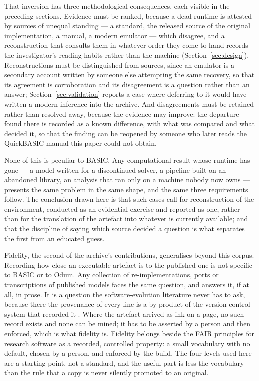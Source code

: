 That inversion has three methodological consequences, each visible in the preceding sections. Evidence must be ranked, because a dead runtime is attested by sources of unequal standing --- a standard, the released source of the original implementation, a manual, a modern emulator --- which disagree, and a reconstruction that consults them in whatever order they come to hand records the investigator's reading habits rather than the machine (Section~\ref{sec:design}). Reconstructions must be distinguished from sources, since an emulator is a secondary account written by someone else attempting the same recovery, so that its agreement is corroboration and its disagreement is a question rather than an answer; Section~\ref{sec:validation} reports a case where deferring to it would have written a modern inference into the archive. And disagreements must be retained rather than resolved away, because the evidence may improve: the departure found there is recorded as a known difference, with what was compared and what decided it, so that the finding can be reopened by someone who later reads the QuickBASIC manual this paper could not obtain.

None of this is peculiar to BASIC. Any computational result whose runtime has gone --- a model written for a discontinued solver, a pipeline built on an abandoned library, an analysis that ran only on a machine nobody now owns --- presents the same problem in the same shape, and the same three requirements follow. The conclusion drawn here is that such cases call for reconstruction of the environment, conducted as an evidential exercise and reported as one, rather than for the translation of the artefact into whatever is currently available; and that the discipline of saying which source decided a question is what separates the first from an educated guess.

Fidelity, the second of the archive's contributions, generalises beyond this corpus. Recording how close an executable artefact is to the published one is not specific to BASIC or to Odum. Any collection of re-implementations, ports or transcriptions of published models faces the same question, and answers it, if at all, in prose. It is a question the software-evolution literature never has to ask, because there the provenance of every line is a by-product of the version-control system that recorded it \citep{robles2005,spinellis2021}. Where the artefact arrived as ink on a page, no such record exists and none can be mined; it has to be asserted by a person and then enforced, which is what fidelity is. Fidelity belongs beside the FAIR principles for research software \citep{wilkinson2016,barker2022} as a recorded, controlled property: a small vocabulary with no default, chosen by a person, and enforced by the build. The four levels used here are a starting point, not a standard, and the useful part is less the vocabulary than the rule that a copy is never silently promoted to an original.


